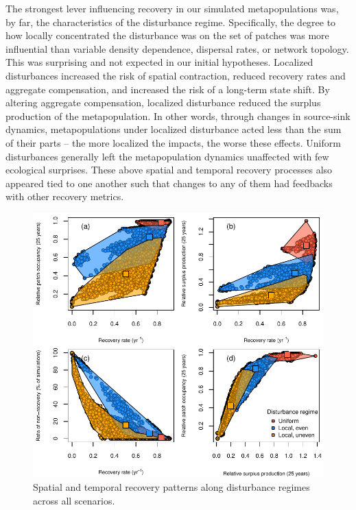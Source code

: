 \documentclass[
]{article}
\begin{document}
The strongest lever influencing recovery in our simulated
metapopulations was, by far, the characteristics of the disturbance
regime. Specifically, the degree to how locally concentrated the
disturbance was on the set of patches was more influential than variable
density dependence, dispersal rates, or network topology. This was
surprising and not expected in our initial hypotheses. Localized
disturbances increased the risk of spatial contraction, reduced recovery
rates and aggregate compensation, and increased the risk of a long-term
state shift. By altering aggregate compensation, localized disturbance
reduced the surplus production of the metapopulation. In other words,
through changes in source-sink dynamics, metapopulations under localized
disturbance acted less than the sum of their parts -- the more localized
the impacts, the worse these effects. Uniform disturbances generally
left the metapopulation dynamics unaffected with few ecological
surprises. These above spatial and temporal recovery processes also
appeared tied to one another such that changes to any of them had
feedbacks with other recovery metrics.

\begin{figure}[H]

{\centering \includegraphics{Managing_for_ecological_surprises_in_metapopulations_files/figure-latex/disturbance regime-1} 

}

\caption{Spatial and temporal recovery patterns along disturbance regimes across all scenarios.}\label{fig:disturbance regime}
\end{figure}
\newpage
\end{document}
